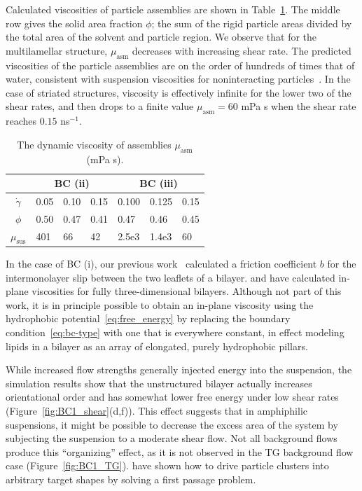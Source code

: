 \documentclass[prb,preprint,showpacs,preprintnumbers,amsmath,amssymb,longbibliography]{revtex4-1}
\begin{document}
Calculated viscosities of particle assemblies are shown in
Table~\ref{tbl:bcii_visc}. The middle row gives the solid area fraction
$\phi$; the sum of the rigid particle areas divided by the total area of
the solvent and particle region. We observe that for the multilamellar
structure, $\mu_{\text{asm}}$ decreases with increasing shear rate. The
predicted viscosities of the particle assemblies are on the order of
hundreds of times that of water, consistent with suspension viscosities
for noninteracting particles~\cite{KONIJN201461}. In the case of
striated structures, viscosity is effectively infinite for the lower two
of the shear rates, and then drops to a finite value $\mu_{\text{asm}} =
60$ mPa s when the shear rate reaches $0.15$ ns$^{-1}$.
\begin{table}
  \caption{\label{tbl:bcii_visc} The dynamic viscosity of assemblies
  $\mu_{\text{asm}}$ (mPa s).}
\centering
\begin{tabularx}{0.7\textwidth}{c|X|X|X||X|X|X}
&\multicolumn{3}{c||}{BC (ii)} & \multicolumn{3}{c}{BC (iii)}\\
\hline
  $\dot \gamma$ & 0.05 & 0.10 \quad & 0.15 & 0.100 & 0.125 & 0.15\\
  \hline
  $\phi$ & 0.50 & 0.47 & 0.41 & 0.47 & 0.46 & 0.45 \\
  \hline
  $\mu_{\text{sus}} $ & 401 & 66 & 42 & 2.5e3 & 1.4e3 & 60\\
\hline
\end{tabularx}
\end{table}

In the case of BC (i), our previous work~\cite{Fu2022_JFM} calculated a
friction coefficient $b$ for the intermonolayer slip between the two
leaflets of a bilayer. \citet{denOtter2007,Zgorski2019} and
\citet{doi:10.1073/pnas.2100156118} have calculated in-plane viscosities
for fully three-dimensional bilayers. Although not part of this work, it
is in principle possible to obtain an in-plane viscosity using the
hydrophobic potential~\eqref{eq:free_energy} by replacing the boundary
condition~\eqref{eq:bc-type} with one that is everywhere constant, in
effect modeling lipids in a bilayer as an array of elongated, purely
hydrophobic pillars. 

While increased flow strengths generally injected energy into the
suspension, the simulation results show that the unstructured bilayer
actually increases orientational order and has somewhat lower free
energy under low shear rates (Figure~\ref{fig:BC1_shear}(d,f)). This
effect suggests that in amphiphilic suspensions, it might be possible to
decrease the excess area of the system by subjecting the suspension to a
moderate shear flow. Not all background flows produce this
``organizing'' effect, as it is not observed in the TG background flow
case (Figure~\ref{fig:BC1_TG}). \citet{PhysRevLett.128.256102} have
shown how to drive particle clusters into arbitrary target shapes by
solving a first passage problem.
\end{document}
